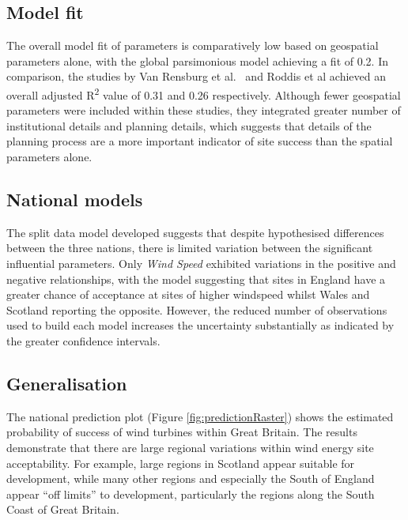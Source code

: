 \documentclass[a4paper,]{article}
\theoremstyle{definition}
\theoremstyle{definition}
\theoremstyle{definition}
\theoremstyle{remark}
\begin{document}
\hypertarget{model-fit}{%
\subsection{Model fit}\label{model-fit}}

The overall model fit of parameters is comparatively low based on geospatial parameters alone, with the global parsimonious model achieving a fit of 0.2. In comparison, the studies by Van Rensburg et al.~\citep{VanRensburg20} and Roddis et al \citep{Roddis2018} achieved an overall adjusted R\textsuperscript{2} value of 0.31 and 0.26 respectively. Although fewer geospatial parameters were included within these studies, they integrated greater number of institutional details and planning details, which suggests that details of the planning process are a more important indicator of site success than the spatial parameters alone.

\hypertarget{national-models}{%
\subsection{National models}\label{national-models}}

The split data model developed suggests that despite hypothesised differences between the three nations, there is limited variation between the significant influential parameters. Only \emph{Wind Speed} exhibited variations in the positive and negative relationships, with the model suggesting that sites in England have a greater chance of acceptance at sites of higher windspeed whilst Wales and Scotland reporting the opposite. However, the reduced number of observations used to build each model increases the uncertainty substantially as indicated by the greater confidence intervals.

\hypertarget{generalisation-1}{%
\subsection{Generalisation}\label{generalisation-1}}

The national prediction plot (Figure \ref{fig:predictionRaster}) shows the estimated probability of success of wind turbines within Great Britain. The results demonstrate that there are large regional variations within wind energy site acceptability. For example, large regions in Scotland appear suitable for development, while many other regions and especially the South of England appear ``off limits'' to development, particularly the regions along the South Coast of Great Britain.
\end{document}
